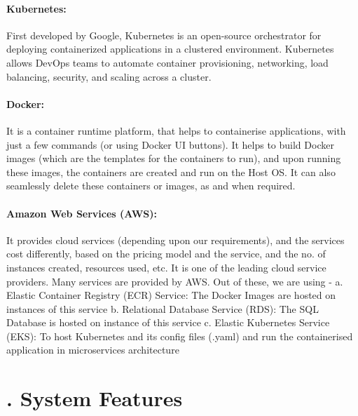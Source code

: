\documentclass{scrreprt}
\begin{document}
\subsubsection{\textbf{Kubernetes:}}	
First developed by Google, Kubernetes is an open-source orchestrator for deploying containerized applications in a clustered environment. Kubernetes allows DevOps teams to automate container provisioning, networking, load balancing, security, and scaling across a cluster.

\subsubsection{\textbf{Docker:}}	
It is a container runtime platform, that helps to containerise applications, with just a few commands (or using Docker UI buttons). It helps to build Docker images (which are the templates for the containers to run), and upon running these images, the containers are created and run on the Host OS. It can also seamlessly delete these containers or images, as and when required.

\subsubsection{\textbf{Amazon Web Services (AWS):}}	
It provides cloud services (depending upon our requirements), and the services cost differently, based on the pricing model and the service, and the no. of instances created, resources used, etc. It is one of the leading cloud service providers.
    Many services are provided by AWS. Out of these, we are using - 
a. Elastic Container Registry (ECR) Service: The Docker Images are hosted on instances of this service
b. Relational Database Service (RDS): The SQL Database is hosted on instance of this service
c. Elastic Kubernetes Service (EKS): To host Kubernetes and its config files (.yaml) and run the containerised application in microservices architecture

\chapter{. System Features}
\end{document}
